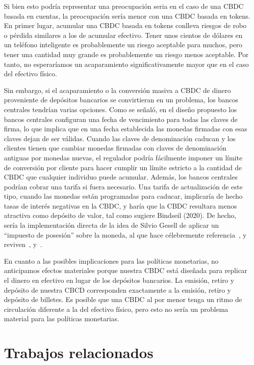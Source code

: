 \documentclass[10pt,spanish]{article}
\begin{document}
Si bien esto podría representar una preocupación seria en el caso de una
CBDC basada en cuentas, la preocupación sería menor con una CBDC basada
en tokens. En primer lugar, acumular una CBDC basada en tokens conlleva
riesgos de robo o pérdida similares a los de acumular efectivo. Tener
unos cientos de dólares en un teléfono inteligente es probablemente un
riesgo aceptable para muchos, pero tener una cantidad muy grande es
probablemente un riesgo menos aceptable. Por tanto, no esperaríamos un
acaparamiento significativamente mayor que en el caso del efectivo
físico.

Sin embargo, si el acaparamiento o la conversión masiva a CBDC de dinero
proveniente de depósitos bancarios se convirtieran en un problema, los bancos
centrales tendrían varias opciones. Como se señaló, en el diseño propuesto los
bancos centrales configuran una fecha de vencimiento para todas las claves de
firma, lo que implica que en una fecha establecida las monedas firmadas con
esas claves dejan de ser válidas. Cuando las claves de denominación caducan y
los clientes tienen que cambiar monedas firmadas con claves de denominación
antiguas por monedas nuevas, el regulador podría fácilmente imponer un límite
de conversión por cliente para hacer cumplir un límite estricto a la cantidad
de CBDC que cualquier individuo puede acumular. Además, los bancos centrales
podrían cobrar una tarifa si fuera necesario. Una tarifa de actualización de
este tipo, cuando las monedas están programadas para caducar, implicaría de
hecho tasas de interés negativas en la CBDC, y haría que la CBDC resultara
menos atractiva como depósito de valor, tal como sugiere Bindseil (2020). De
hecho, sería la implementación directa de la idea de Silvio Gesell de aplicar
un ``impuesto de posesión'' sobre la moneda, al que hace célebremente
referencia~\citet{Keynes}, y reviven~\citet{Goodfriend}, \citet{Buiter}
y~\citet{Agarwal}.

En cuanto a las posibles implicaciones para las políticas monetarias, no
anticipamos efectos materiales porque nuestra CBDC está diseñada para
replicar el dinero en efectivo en lugar de los depósitos bancarios. La
emisión, retiro y depósito de nuestra CBCD corresponden exactamente a la
emisión, retiro y depósito de billetes. Es posible que una CBDC al por
menor tenga un ritmo de circulación diferente a la del efectivo físico,
pero esto no sería un problema material para las políticas monetarias.

\hypertarget{trabajos-relacionados}{%
\section{Trabajos relacionados}\label{6.-trabajos-relacionados}}
\end{document}
